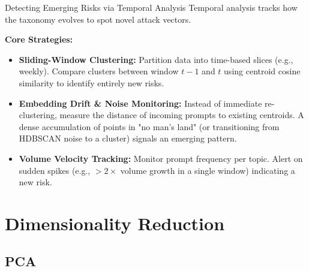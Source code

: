 \documentclass[aspectratio=169]{beamer}
\begin{document}
\begin{frame}{Detecting Emerging Risks via Temporal Analysis}
    Temporal analysis tracks how the taxonomy evolves to spot novel attack vectors.
    \vspace{0.3cm}
    
    \textbf{Core Strategies:}
    \begin{itemize}
        \item \textbf{Sliding-Window Clustering:} Partition data into time-based slices (e.g., weekly). Compare clusters between window $t-1$ and $t$ using centroid cosine similarity to identify entirely new risks.
        \item \textbf{Embedding Drift \& Noise Monitoring:} Instead of immediate re-clustering, measure the distance of incoming prompts to existing centroids. A dense accumulation of points in "no man's land" (or transitioning from HDBSCAN noise to a cluster) signals an emerging pattern.
        \item \textbf{Volume Velocity Tracking:} Monitor prompt frequency per topic. Alert on sudden spikes (e.g., $>2\times$ volume growth in a single window) indicating a new risk.
    \end{itemize}

\end{frame}


\section{Dimensionality Reduction}

\subsection{PCA}
\end{document}
